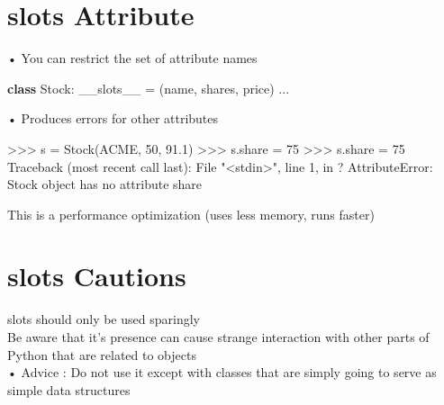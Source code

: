 \documentclass[
  letterpaper,
  DIV=11,
  numbers=noendperiod]{scrreprt}
\newenvironment{Shaded}{\begin{snugshade}}{\end{snugshade}}
\newcommand{\KeywordTok}[1]{\textcolor[rgb]{0.00,0.23,0.31}{\textbf{#1}}}
\newcommand{\NormalTok}[1]{\textcolor[rgb]{0.00,0.23,0.31}{#1}}
\newcommand{\OperatorTok}[1]{\textcolor[rgb]{0.37,0.37,0.37}{#1}}
\newcommand{\StringTok}[1]{\textcolor[rgb]{0.13,0.47,0.30}{#1}}
\newcommand{\VariableTok}[1]{\textcolor[rgb]{0.07,0.07,0.07}{#1}}
\begin{document}
\chapter{slots Attribute}\label{slots-attribute}

• You can restrict the set of attribute names

\begin{Shaded}
\begin{Highlighting}[]
\KeywordTok{class}\NormalTok{ Stock: }\VariableTok{\_\_slots\_\_} \OperatorTok{=}\NormalTok{ (}\StringTok{\textquotesingle{}name\textquotesingle{}}\NormalTok{, }\StringTok{\textquotesingle{}shares\textquotesingle{}}\NormalTok{, }\StringTok{\textquotesingle{}price\textquotesingle{}}\NormalTok{) ... }
\end{Highlighting}
\end{Shaded}

• Produces errors for other attributes

\begin{Shaded}
\begin{Highlighting}[]
\NormalTok{\textgreater{}\textgreater{}\textgreater{} s = Stock(\textquotesingle{}ACME\textquotesingle{}, 50, 91.1)  }
\NormalTok{\textgreater{}\textgreater{}\textgreater{} s.share = 75  }
\NormalTok{\textgreater{}\textgreater{}\textgreater{} s.share = 75  }
\NormalTok{Traceback (most recent call last):  }
\NormalTok{    File "\textless{}stdin\textgreater{}", line 1, in ?  }
\NormalTok{AttributeError: \textquotesingle{}Stock\textquotesingle{} object has no attribute \textquotesingle{}share\textquotesingle{} }
\end{Highlighting}
\end{Shaded}

This is a performance optimization (uses less memory, runs faster)


\chapter{slots Cautions}\label{slots-cautions}

slots should only be used sparingly\\
Be aware that it's presence can cause strange interaction with other
parts of Python that are related to objects\\
• Advice : Do not use it except with classes that are simply going to
serve as simple data structures

\end{document}
